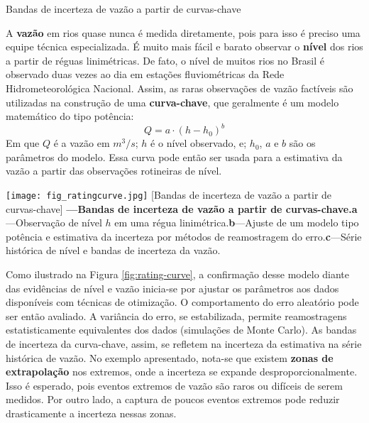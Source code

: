 \documentclass[./main.tex]{subfiles}
\begin{document}
\begin{simplebox}[
    float=htb,
    label={destaque_curvas_chave},
    nameref={Curvas-chave}
    ]{Bandas de incerteza de vazão a partir de curvas-chave}
    \footnotesize
    \begin{minipage}[t]{\linewidth}    
    \par A \textbf{vazão} em rios quase nunca é medida diretamente, pois para isso é preciso uma equipe técnica especializada. É muito mais fácil e barato observar o \textbf{nível} dos rios a partir de réguas linimétricas. De fato, o nível de muitos rios no Brasil é observado duas vezes ao dia em estações fluviométricas da Rede Hidrometeorológica Nacional. Assim, as raras observações de vazão factíveis são utilizadas na construção de uma \textbf{curva-chave}, que geralmente é um modelo matemático do tipo potência:
    \begin{equation*} %
    		\label{eq:rating_curve}
    		Q = a \cdot (h - h_0)^b
    \end{equation*}
    Em que $Q$ é a vazão em $m^{3}/s$; $h$ é o nível observado, e; $h_0$, $a$ e $b$ são os parâmetros do modelo. Essa curva pode então ser usada para a estimativa da vazão a partir das observações rotineiras de nível. 
    \end{minipage}
    \begin{minipage}[t]{\linewidth}
        \begin{minipage}[t]{\linewidth}
        \vspace*{5pt}
        	\texttt{[image: fig\_ratingcurve.jpg]}		
        	[Bandas de incerteza de vazão a partir de curvas-chave]{
                \textbf{---\;Bandas de incerteza de vazão a partir de curvas-chave.}\;\textbf{a}\;---\;Observação de nível $h$ em uma régua linimétrica.\;\textbf{b}\;---\;Ajuste de um modelo tipo potência e estimativa da incerteza por métodos de reamostragem do erro.\;\textbf{c}\;---\;Série histórica de nível e bandas de incerteza da vazão.
        	}
            \label{fig:rating-curve}  %
        \vspace*{5pt}
    \end{minipage}
    \end{minipage}
    \begin{minipage}[t]{\linewidth}
    \par Como ilustrado na Figura \ref{fig:rating-curve}, a confirmação desse modelo diante das evidências de nível e vazão inicia-se por ajustar os parâmetros aos dados disponíveis com técnicas de otimização. O comportamento do erro aleatório pode ser então avaliado. A variância do erro, se estabilizada, permite reamostragens estatisticamente equivalentes dos dados (simulações de Monte Carlo). As bandas de incerteza da curva-chave, assim, se refletem na incerteza da estimativa na série histórica de vazão. No exemplo apresentado, nota-se que existem \textbf{zonas de extrapolação} nos extremos, onde a incerteza se expande desproporcionalmente. Isso é esperado, pois eventos extremos de vazão são raros ou difíceis de serem medidos. Por outro lado, a captura de poucos eventos extremos pode reduzir drasticamente a incerteza nessas zonas. 

\end{minipage}
\end{simplebox}
\end{document}
